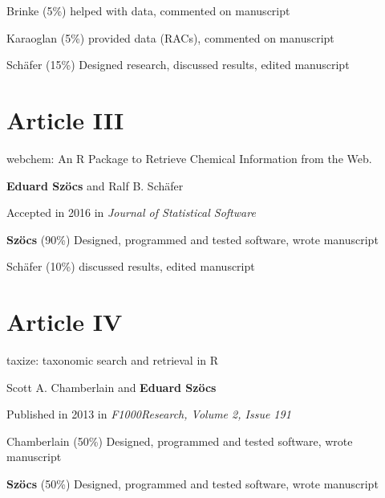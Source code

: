 \begin{sloppypar}
\begin{description}
	Brinke (5\%) helped with data, commented on manuscript

	Karaoglan (5\%) provided data (RACs), commented on manuscript

	Schäfer (15\%) Designed research, discussed results, edited manuscript
\end{description}
\normalsize
\vfill

\section*{Article III}
\vspace{-1em}
\small
\begin{description}
    \setlength\itemsep{0em}
	\item[Title:] webchem: An R Package to Retrieve Chemical Information from the Web.
	\item[Authors:] \textbf{Eduard Szöcs} and Ralf B. Schäfer
	\item[Status:] Accepted in 2016 in \emph{Journal of Statistical Software}
	\item[Contributions:] \textbf{Szöcs} (90\%) Designed, programmed and tested software, wrote manuscript

	Schäfer (10\%) discussed results, edited manuscript
\end{description}
\normalsize
\vfill


\section*{Article IV}
\vspace{-1em}
\small
\begin{description}
    \setlength\itemsep{0em}
	\item[Title:] taxize: taxonomic search and retrieval in R
	\item[Authors:] Scott A. Chamberlain and \textbf{Eduard Szöcs}
	\item[Status:] Published in 2013 in \emph{F1000Research, Volume 2, Issue 191}
	\item[Contributions:] Chamberlain (50\%) Designed, programmed and tested software, wrote manuscript

	\textbf{Szöcs} (50\%) Designed, programmed and tested software, wrote manuscript
\end{description}
\end{sloppypar}


